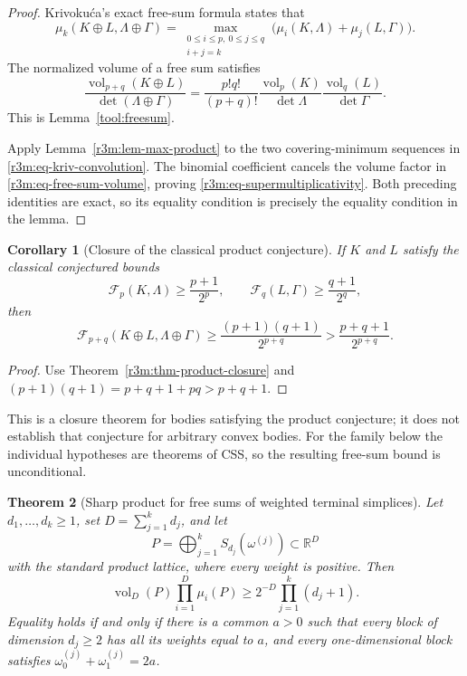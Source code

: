 \documentclass[11pt,a4paper]{article}
\newtheorem{theorem}{Theorem}[section]
\newtheorem{corollary}[theorem]{Corollary}
\theoremstyle{remark}\newtheorem{remark}[theorem]{Remark}
\begin{document}
\begin{proof}
Krivoku\'ca's exact free-sum formula
\cite[Theorem~1.2]{Krivokuca} states that
\begin{equation}
\label{r3m:eq-kriv-convolution}
 \mu_k(K\oplus L,\Lambda\oplus\Gamma)=
 \max_{\substack{0\le i\le p,\ 0\le j\le q\\i+j=k}}
       \bigl(\mu_i(K,\Lambda)+\mu_j(L,\Gamma)\bigr).
\end{equation}
The normalized volume of a free sum satisfies
\begin{equation}
\label{r3m:eq-free-sum-volume}
 \frac{\operatorname{vol}_{p+q}(K\oplus L)}
      {\det(\Lambda\oplus\Gamma)}
 =
 \frac{p!q!}{(p+q)!}
 \frac{\operatorname{vol}_p(K)}{\det\Lambda}
 \frac{\operatorname{vol}_q(L)}{\det\Gamma}.
\end{equation}
This is Lemma~\ref{tool:freesum}.

Apply Lemma~\ref{r3m:lem-max-product} to the two covering-minimum
sequences in \eqref{r3m:eq-kriv-convolution}.
The binomial coefficient cancels the volume factor in
\eqref{r3m:eq-free-sum-volume}, proving
\eqref{r3m:eq-supermultiplicativity}.
Both preceding identities are exact, so its equality condition is
precisely the equality condition in the lemma.
\end{proof}

\begin{corollary}[Closure of the classical product conjecture]
\label{r3m:cor-conjecture-closure}
If $K$ and $L$ satisfy the classical conjectured bounds
\[
 \mathcal F_p(K,\Lambda)\ge\frac{p+1}{2^p},
 \qquad
 \mathcal F_q(L,\Gamma)\ge\frac{q+1}{2^q},
\]
then
\[
 \mathcal F_{p+q}(K\oplus L,\Lambda\oplus\Gamma)
 \ge\frac{(p+1)(q+1)}{2^{p+q}}
 >\frac{p+q+1}{2^{p+q}}.
\]
\end{corollary}

\begin{proof}
Use Theorem~\ref{r3m:thm-product-closure} and
$(p+1)(q+1)=p+q+1+pq>p+q+1$.
\end{proof}

This is a closure theorem for bodies satisfying the product conjecture;
it does not establish that conjecture for arbitrary convex bodies.
For the family below the individual hypotheses are theorems of CSS,
so the resulting free-sum bound is unconditional.

\begin{theorem}[Sharp product for free sums of weighted terminal simplices]
\label{r3m:thm-weighted-sum-product}
Let $d_1,\ldots,d_k\ge1$, set $D=\sum_{j=1}^k d_j$, and let
\[
 P=\bigoplus_{j=1}^k S_{d_j}(\omega^{(j)})
 \subset\mathbb R^D
\]
with the standard product lattice, where every weight is positive.
Then
\begin{equation}
\label{r3m:eq-weighted-sum-product}
 \operatorname{vol}_D(P)\prod_{i=1}^D\mu_i(P)
 \ge 2^{-D}\prod_{j=1}^k(d_j+1).
\end{equation}
Equality holds if and only if there is a common $a>0$ such that
every block of dimension $d_j\ge2$ has all its weights equal to $a$,
and every one-dimensional block satisfies
$\omega^{(j)}_0+\omega^{(j)}_1=2a$.
\end{theorem}
\end{document}

